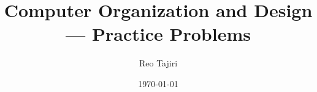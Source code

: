 \documentclass[10pt]{article}
\title{Computer Organization and Design --- Practice Problems}
\author{Reo Tajiri}
\date{\today}
\newcommand{\headerlinkprefix}{sol}
\newcommand{\headerrightlabel}{Solution}
\begin{document}
\maketitle
\pagestyle{plain}
\hypertarget{toc}{}
\tableofcontents
\newpage
\pagestyle{fancy}






\renewcommand{\headerlinkprefix}{prob}
\renewcommand{\headerrightlabel}{Problem}




\end{document}
